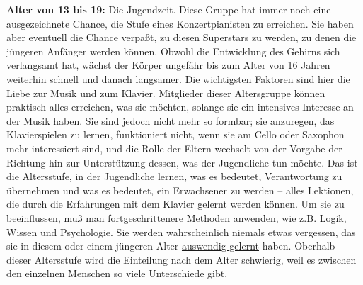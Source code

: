 \textbf{Alter von 13 bis 19:} Die Jugendzeit.
Diese Gruppe hat immer noch eine ausgezeichnete Chance, die Stufe eines Konzertpianisten zu erreichen.
Sie haben aber eventuell die Chance verpaßt, zu diesen Superstars zu werden, zu denen die jüngeren Anfänger werden können.
Obwohl die Entwicklung des Gehirns sich verlangsamt hat, wächst der Körper ungefähr bis zum Alter von 16 Jahren weiterhin schnell und danach langsamer.
Die wichtigsten Faktoren sind hier die Liebe zur Musik und zum Klavier.
Mitglieder dieser Altersgruppe können praktisch alles erreichen, was sie möchten, solange sie ein intensives Interesse an der Musik haben.
Sie sind jedoch nicht mehr so formbar; sie anzuregen, das Klavierspielen zu lernen, funktioniert  nicht, wenn sie am Cello oder Saxophon mehr interessiert sind, und die Rolle der Eltern wechselt von der Vorgabe der Richtung hin zur Unterstützung dessen, was der Jugendliche tun möchte.
Das ist die Altersstufe, in der Jugendliche lernen, was es bedeutet, Verantwortung zu übernehmen und was es bedeutet, ein Erwachsener zu werden -- alles Lektionen, die durch die Erfahrungen mit dem Klavier gelernt werden können.
Um sie zu beeinflussen, muß man fortgeschrittenere Methoden anwenden, wie z.B. Logik, Wissen und Psychologie.
Sie werden wahrscheinlich niemals etwas vergessen, das sie in diesem oder einem jüngeren Alter \hyperref[c1iii6]{auswendig gelernt} haben.
Oberhalb dieser Altersstufe wird die Einteilung nach dem Alter schwierig, weil es zwischen den einzelnen Menschen so viele Unterschiede gibt.


\label{c1iii18c20}

